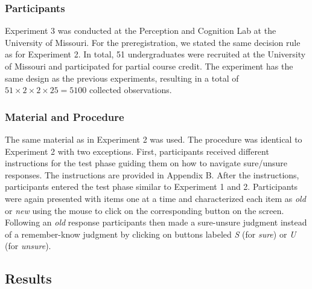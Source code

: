 \documentclass[english,,man,floatsintext]{apa6}
\begin{document}
\hypertarget{participants-1}{%
\subsubsection{Participants}\label{participants-1}}

Experiment 3 was conducted at the Perception and Cognition Lab at the University of Missouri. For the preregistration, we stated the same decision rule as for Experiment 2. In total, 51 undergraduates were recruited at the University of Missouri and participated for partial course credit. The experiment has the same design as the previous experiments, resulting in a total of \(51 \times 2 \times 2 \times 25 = 5100\) collected observations.

\hypertarget{material-and-procedure}{%
\subsubsection{Material and Procedure}\label{material-and-procedure}}

The same material as in Experiment 2 was used. The procedure was identical to Experiment 2 with two exceptions. First, participants received different instructions for the test phase guiding them on how to navigate sure/unsure responses. The instructions are provided in Appendix B. After the instructions, participants entered the test phase similar to Experiment 1 and 2. Participants were again presented with items one at a time and characterized each item as \emph{old} or \emph{new} using the mouse to click on the corresponding button on the screen. Following an \emph{old} response participants then made a sure-unsure judgment instead of a remember-know judgment by clicking on buttons labeled \emph{S} (for \emph{sure}) or \emph{U} (for \emph{unsure}).

\hypertarget{results-2}{%
\subsection{Results}\label{results-2}}
\end{document}
